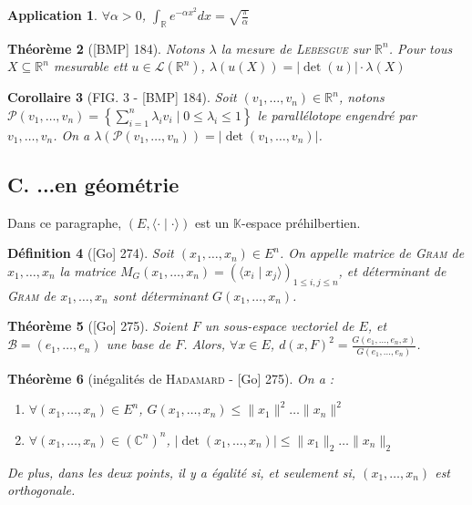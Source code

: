 \documentclass[10pt, a4paper, parskip=full, twoside, twocolumn]{report}
\newtheorem{definition}{Définition}
\newtheorem{theorem}[definition]{Théorème}
\newtheorem{corollary}[definition]{Corollaire}
\newtheorem{application}[definition]{Application}
\newcommand{\IK}{\mathbb{K}}
\newcommand{\IC}{\mathbb{C}}
\newcommand{\IR}{\mathbb{R}}
\begin{document}
\begin{application}
	$\forall \alpha > 0$, $\int_{\IR} e^{-\alpha x^2}dx = \sqrt{\frac{\pi}{\alpha}}$
\end{application}

\begin{theorem}[\textnormal{[BMP] 184}]
	Notons $\lambda$ la mesure de \textsc{Lebesgue} sur $\IR^n$. Pour tous $X\subseteq\IR^n$ mesurable ett $u\in\mathcal{L}(\IR^n)$,
	$\lambda(u(X))=\vert \det(u)\vert\cdot \lambda(X)$
\end{theorem}

\begin{corollary}[FIG. 3 - \textnormal{[BMP] 184}]
	Soit $(v_1,\dots, v_n)\in \IR^n$, notons $\mathcal{P}(v_1,\dots,v_n) = \left\{\sum_{i=1}^{n} \lambda_i v_i \mid 0\leq \lambda_i \leq 1\right\}$
	le parallélotope engendré par $v_1,\dots,v_n$. On a $\lambda(\mathcal{P}(v_1,\dots,v_n))=\vert \det(v_1,\dots, v_n)\vert$.
\end{corollary}

\subsection*{C. ...en géométrie}
\textcolor{paragraphtext}{Dans ce paragraphe, $(E,\langle \cdot \mid \cdot \rangle)$ est un $\IK$-espace préhilbertien.}

\begin{definition}[\textnormal{[Go] 274}]
	Soit $(x_1,\dots,x_n)\in E^n$. On appelle \emph{matrice de \textsc{Gram} de} $x_1,\dots, x_n$ la matrice 
	$M_G(x_1,\dots,x_n)=\left(\langle x_i\mid x_j\rangle\right)_{1\leq i,j\leq n}$,
	et \emph{déterminant de \textsc{Gram} de} $x_1,\dots, x_n$ sont déterminant $G(x_1,\dots,x_n)$.
\end{definition}

\begin{tcolorbox}[
    breakable, %
    colback=developpement, %
    colframe=gray!0!black, %
    boxrule=0pt, %
    arc=1mm, %
	boxsep=0pt,
	left=0pt, right=0pt, top=0pt, bottom=0pt
]
\begin{theorem}[\textnormal{[Go] 275}]
	\label{149dev21}
	Soient $F$ un sous-espace vectoriel de $E$, et $\mathcal{B}=(e_1,\dots, e_n)$ une base de $F$. Alors, 
	$\forall x\in E$, $d(x,F)^2=\frac{G(e_1,\dots,e_n, x)}{G(e_1,\dots,e_n)}$.
\end{theorem}
\begin{theorem}[inégalités de \textsc{Hadamard} - \textnormal{[Go] 275}]
	\label{149dev22}
	On a :
	\begin{enumerate}
		\item $\forall(x_1,\dots, x_n)\in E^n$, $G(x_1,\dots, x_n)\leq \|x_1\|^2\dots \|x_n\|^2$
		\item $\forall (x_1,\dots,x_n)\in \left(\IC^n\right)^n$, $\vert \det(x_1,\dots, x_n)\vert\leq \|x_1\|_2\dots \|x_n\|_2$
	\end{enumerate}
	
	De plus, dans les deux points, il y a égalité si, et seulement si, $(x_1,\dots, x_n)$ est orthogonale.
\end{theorem}
\end{tcolorbox}
\end{document}

